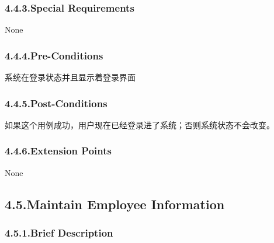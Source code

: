 \documentclass{article}
\begin{document}
\subsubsection{4.4.3.\hspace*{0.5em}Special Requirements}\label{sec-special-requirements}%

\noindent{}None%

\subsubsection{4.4.4.\hspace*{0.5em}Pre-Conditions}\label{sec-pre-conditions}%

\noindent{}系统在登录状态并且显示着登录界面%

\subsubsection{4.4.5.\hspace*{0.5em}Post-Conditions}\label{sec-post-conditions}%

\noindent{}如果这个用例成功，用户现在已经登录进了系统；否则系统状态不会改变。%

\subsubsection{4.4.6.\hspace*{0.5em}Extension Points}\label{sec-extension-points}%

\noindent{}None%

\subsection{4.5.\hspace*{0.5em}Maintain Employee Information}\label{sec-maintain-employee-information}%

\subsubsection{4.5.1.\hspace*{0.5em}Brief Description}\label{sec-brief-description}%
\end{document}
